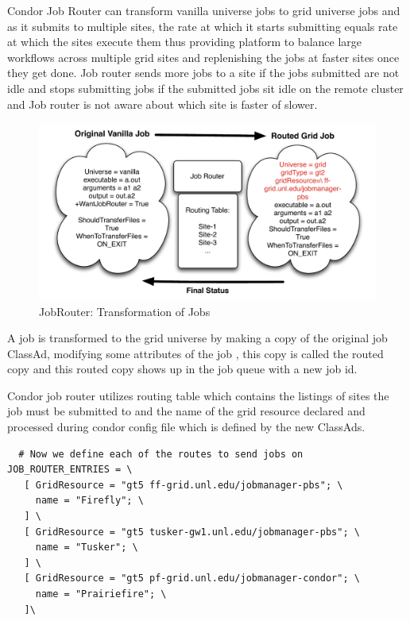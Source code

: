 \documentclass[ms,electronic,double]{nuthesis}
\begin{document}
Condor Job Router can transform vanilla universe jobs to grid universe jobs and 
as it submits to multiple sites, the rate at which it starts submitting equals 
rate at which the sites execute them thus providing platform to balance large 
workflows across multiple grid sites and replenishing the jobs at
faster sites once they get done. Job router sends more jobs to a site if 
the jobs submitted are not idle and stops submitting jobs if the submitted jobs 
sit idle on the remote cluster and Job router is not aware about which site is 
faster of slower.


\begin{figure}[htbp!]
\begin{center}
\includegraphics[scale=0.75]{images/jobRouter}
\caption{JobRouter: Transformation of Jobs}
\label{fig:JobRouter}
\end{center}
\end{figure}

A job is transformed to the grid universe by making a copy of the original job 
ClassAd, modifying some attributes of the job , this copy is called the routed 
copy and this routed copy shows up in the job queue with a new job id.

Condor job router utilizes routing table which contains the listings of sites 
the job must be submitted to and the name of the grid resource declared and 
processed during condor config file which is defined by the new ClassAds.

\begin{lstlisting}
  # Now we define each of the routes to send jobs on
JOB_ROUTER_ENTRIES = \
   [ GridResource = "gt5 ff-grid.unl.edu/jobmanager-pbs"; \
     name = "Firefly"; \
   ] \
   [ GridResource = "gt5 tusker-gw1.unl.edu/jobmanager-pbs"; \
     name = "Tusker"; \
   ] \
   [ GridResource = "gt5 pf-grid.unl.edu/jobmanager-condor"; \
     name = "Prairiefire"; \
   ]\

\end{lstlisting}
\end{document}
